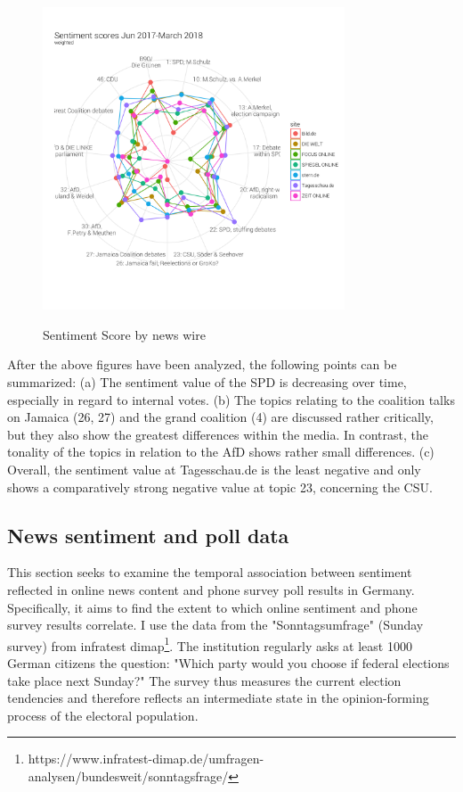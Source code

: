 \documentclass[12pt,a4paper,notitlepage]{article}
\begin{document}
\begin{figure}[H]
	\caption{Sentiment Score by news wire}
	\begin{center}
			\includegraphics[width=0.8\textwidth,keepaspectratio]{../figs/sentscore_radar.png}
			\label{fig_sentscore_radar}
	\end{center}
\end{figure}

After the above figures have been analyzed, the following points can be summarized: (a) The sentiment value of the SPD is decreasing over time, especially in regard to internal votes. (b) The topics relating to the coalition talks on Jamaica (26, 27) and the grand coalition (4) are discussed rather critically, but they also show the greatest differences within the media. In contrast, the tonality of the topics in relation to the AfD shows rather small differences. (c) Overall, the sentiment value at Tagesschau.de is the least negative and only shows a comparatively strong negative value at topic 23, concerning the CSU. 

\subsection{News sentiment and poll data}\label{ch_correlation}

This section seeks to examine the temporal association between sentiment reflected in online news content and phone survey poll results in Germany. Specifically, it aims to find the extent to which online sentiment and phone survey results correlate. I use the data from the "Sonntagsumfrage" (Sunday survey) from infratest dimap\footnote{https://www.infratest-dimap.de/umfragen-analysen/bundesweit/sonntagsfrage/}. The institution regularly asks at least 1000 German citizens the question: "Which party would you choose if federal elections take place next Sunday?" The survey thus measures the current election tendencies and therefore reflects an intermediate state in the opinion-forming process of the electoral population.
\end{document}
